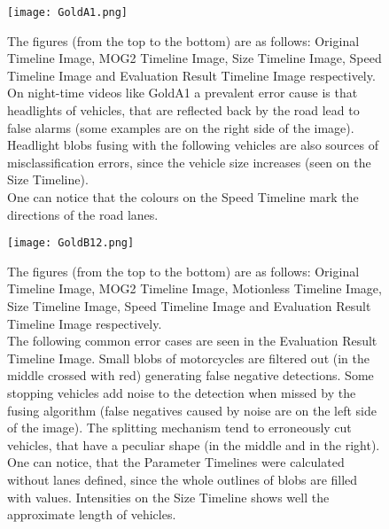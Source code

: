 \centering
\begin{figure}[h!]
	\centering
	\captionsetup{width=0.9\textwidth,aboveskip=10pt}
	\texttt{[image: GoldA1.png]}
	\caption[Some output Timelines of the GoldA1 test video]{The figures (from the top to the bottom) are as follows: Original Timeline Image, MOG2 Timeline Image, Size Timeline Image, Speed Timeline Image and Evaluation Result Timeline Image respectively. \\
	On night-time videos like GoldA1 a prevalent error cause is that headlights of vehicles, that are reflected back by the road lead to false alarms (some examples are on the right side of the image). Headlight blobs fusing with the following vehicles are also sources of misclassification errors, since the vehicle size increases (seen on the Size Timeline). \\
	One can notice that the colours on the Speed Timeline  mark the directions of the road lanes. \label{fig:GoldA1}}
\end{figure}

\centering
\begin{figure}[h!]
	\centering
	\captionsetup{width=0.9\textwidth,aboveskip=10pt}
	\texttt{[image: GoldB12.png]}
	\caption[Some output Timelines of the GoldB1 test video]{The figures (from the top to the bottom) are as follows: Original Timeline Image, MOG2 Timeline Image, Motionless Timeline Image, Size Timeline Image, Speed Timeline Image and Evaluation Result Timeline Image respectively.\\
	 The following common error cases are seen in the Evaluation Result Timeline Image. Small blobs of motorcycles are filtered out (in the middle crossed with red) generating false negative detections. Some stopping vehicles add noise to the detection when missed by the fusing algorithm (false negatives caused by noise are on the left side of the image). The splitting mechanism tend to erroneously cut vehicles, that have a peculiar shape (in the middle and in the right). \\
	 One can notice, that the Parameter Timelines were calculated without lanes defined, since the whole outlines of blobs are filled with values. Intensities on the Size Timeline shows well the approximate length of vehicles. \label{fig:GoldB1}}
\end{figure}

